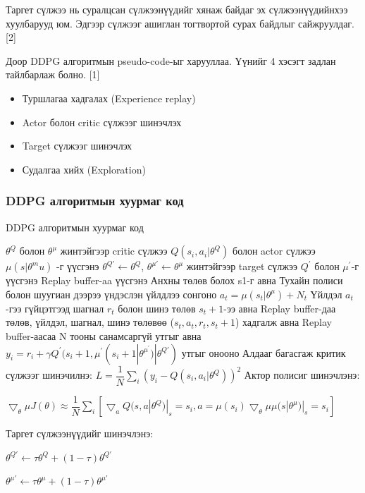 \documentclass[12pt,A4]{report}
\begin{document}
Таргет сүлжээ нь суралцсан сүлжээнүүдийг хянаж байдаг эх сүлжээнүүдийнхээ хуулбарууд юм. Эдгээр сүлжээг ашиглан тогтвортой сурах байдлыг сайжруулдаг.	 [2]

Доор DDPG алгоритмын pseudo-code-ыг харууллаа. Үүнийг 4 хэсэгт задлан тайлбарлаж болно. [1]

\begin{itemize}
	\item Туршлагаа хадгалах (Experience replay)
	\item Actor болон critic сүлжээг шинэчлэх
	\item Target сүлжээг шинэчлэх
	\item Судалгаа хийх (Exploration)
\end{itemize} 

\subsubsection{DDPG алгоритмын хуурмаг код}

\begin{algorithm}[h!]
\caption{DDPG алгоритмын хуурмаг код}
\begin{algorithmic}[1]
\State $\theta^Q$ болон $\theta^{\mu}$ жинтэйгээр critic сүлжээ $Q(s_i,a_i|\theta^Q)$ болон actor сүлжээ $\mu(s|\theta^mu)$ -г үүсгэнэ
\State $\theta^{Q{'}} \longleftarrow \theta^Q$, $\theta^{\mu{'}} \longleftarrow \theta^\mu$ жинтэйгээр target сүлжээ $Q^{'}$ болон $\mu^{'}$-г үүсгэнэ
\State Replay buffer-aa үүсгэнэ
\State Анхны төлөв болох s1-г авна
\State Тухайн полиси болон шуугиан дээрээ үндэслэн үйлдлээ сонгоно $a_t = \mu(s_t|\theta^\mu)+N_t$
\State Үйлдэл $a_t$-гээ гүйцэтгээд шагнал $r_t$ болон шинэ төлөв $s_t+1$-ээ авна
\State Replay buffer-даа төлөв, үйлдэл, шагнал, шинэ төлөвөө ($s_t, a_t, r_t, s_t+1$) хадгалж авна
\State Replay buffer-аасаа N тооны санамсаргүй утгыг авна
\State $y_i=r_i+\gamma{Q^{'}}(s_i+1,\mu^{'}(s_i+1|\theta^{\mu^{'}})|\theta^{Q{'}})$ утгыг онооно
\State Алдааг багасгаж критик сүлжээг шинэчилнэ: $L = \dfrac{1}{N}\sum_{i}(y_i-Q(s_i,a_i|\theta^Q))^2$
\State Актор полисиг шинэчлэнэ: 
\begin{center}
$\bigtriangledown_\theta\mu J(\theta) \approx \dfrac{1}{N}\sum_{i}[\bigtriangledown_a Q(s, a|\theta^Q)|_s=s_i,a=\mu(s_i)\bigtriangledown_\theta\mu \mu(s|\theta^\mu)|_s=s_i]$
\end{center}
\State Таргет сүлжээнүүдийг шинэчлэнэ:
\begin{center}
$\theta^{Q{'}} \longleftarrow \tau\theta^Q + (1-\tau)\theta^{Q{'}}$ 

$\theta^{\mu{'}} \longleftarrow \tau\theta^\mu + (1-\tau)\theta^{\mu{'}}$ 
\end{center}
\EndFor
\EndFor
\end{algorithmic}
\end{algorithm}
\end{document}
